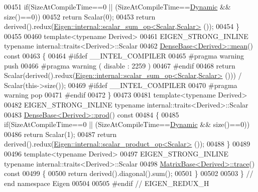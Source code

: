 \begin{DoxyCode}
00451   \textcolor{keywordflow}{if}(SizeAtCompileTime==0 || (SizeAtCompileTime==\hyperlink{namespace_eigen_ad81fa7195215a0ce30017dfac309f0b2}{Dynamic} && size()==0))
00452     \textcolor{keywordflow}{return} Scalar(0);
00453   \textcolor{keywordflow}{return} derived().redux(\hyperlink{struct_eigen_1_1internal_1_1scalar__sum__op}{Eigen::internal::scalar\_sum\_op<Scalar,Scalar>}
      ());
00454 \}
00455 
00460 \textcolor{keyword}{template}<\textcolor{keyword}{typename} Derived>
00461 EIGEN\_STRONG\_INLINE \textcolor{keyword}{typename} internal::traits<Derived>::Scalar
00462 \hyperlink{group___core___module_a89d85ac0cf349eb53481c148033459d7}{DenseBase<Derived>::mean}()\textcolor{keyword}{ const}
00463 \textcolor{keyword}{}\{
00464 \textcolor{preprocessor}{#ifdef \_\_INTEL\_COMPILER}
00465 \textcolor{preprocessor}{  #pragma warning push}
00466 \textcolor{preprocessor}{  #pragma warning ( disable : 2259 )}
00467 \textcolor{preprocessor}{#endif}
00468   \textcolor{keywordflow}{return} Scalar(derived().redux(\hyperlink{struct_eigen_1_1internal_1_1scalar__sum__op}{Eigen::internal::scalar\_sum\_op<Scalar,Scalar>}
      ())) / Scalar(this->size());
00469 \textcolor{preprocessor}{#ifdef \_\_INTEL\_COMPILER}
00470 \textcolor{preprocessor}{  #pragma warning pop}
00471 \textcolor{preprocessor}{#endif}
00472 \}
00473 
00481 \textcolor{keyword}{template}<\textcolor{keyword}{typename} Derived>
00482 EIGEN\_STRONG\_INLINE \textcolor{keyword}{typename} internal::traits<Derived>::Scalar
00483 \hyperlink{group___core___module_a175ceb201923b4c6767770559e47e40e}{DenseBase<Derived>::prod}()\textcolor{keyword}{ const}
00484 \textcolor{keyword}{}\{
00485   \textcolor{keywordflow}{if}(SizeAtCompileTime==0 || (SizeAtCompileTime==\hyperlink{namespace_eigen_ad81fa7195215a0ce30017dfac309f0b2}{Dynamic} && size()==0))
00486     \textcolor{keywordflow}{return} Scalar(1);
00487   \textcolor{keywordflow}{return} derived().redux(\hyperlink{struct_eigen_1_1internal_1_1scalar__product__op}{Eigen::internal::scalar\_product\_op<Scalar>}
      ());
00488 \}
00489 
00496 \textcolor{keyword}{template}<\textcolor{keyword}{typename} Derived>
00497 EIGEN\_STRONG\_INLINE \textcolor{keyword}{typename} internal::traits<Derived>::Scalar
00498 \hyperlink{group___core___module_a2cc7a95b161f3a660bdb8ff048b44161}{MatrixBase<Derived>::trace}()\textcolor{keyword}{ const}
00499 \textcolor{keyword}{}\{
00500   \textcolor{keywordflow}{return} derived().diagonal().sum();
00501 \}
00502 
00503 \} \textcolor{comment}{// end namespace Eigen}
00504 
00505 \textcolor{preprocessor}{#endif // EIGEN\_REDUX\_H}
\end{DoxyCode}
